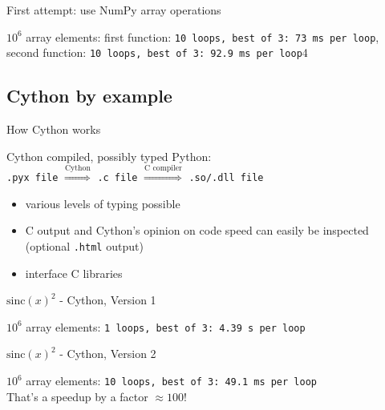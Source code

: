\begin{frame}{First attempt: use NumPy array operations}



\pause
$10^{6}$ array elements: first function: {\texttt{10 loops, best of 3: 73 ms per loop}},
second function: {\texttt{10 loops, best of 3: 92.9 ms per loop}}4

\end{frame}

\subsection{Cython by example}

\begin{frame}{How Cython works}

\begin{exbox}{Cython}
compiled, possibly typed Python:\\[1ex]
{\texttt{.pyx file}} $\stackrel{\text{Cython}}{\Longrightarrow}$ {\texttt{.c file}} $\stackrel{\text{C compiler}}{\Longrightarrow}$ {\texttt{.so/.dll file}}
\end{exbox}

\begin{itemize}
    \item various levels of typing possible
    \item C output and Cython's opinion on code speed can easily be
    inspected (optional {\texttt{.html}} output)
    \item interface C libraries
\end{itemize}

\end{frame}

\begin{frame}[fragile]{$\mathrm{sinc}(x)^{2}$ - Cython, Version 1}



\pause
$10^{6}$ array elements: {\texttt{1 loops, best of 3: 4.39 s per loop}}
\end{frame}

\begin{frame}[fragile]{$\mathrm{sinc}(x)^{2}$ - Cython, Version 2}



\pause
$10^{6}$ array elements: {\texttt{10 loops, best of 3: 49.1 ms per loop}}\\[0.5ex]
That's a \alert{speedup by a factor $\approx 100$}!
\end{frame}

